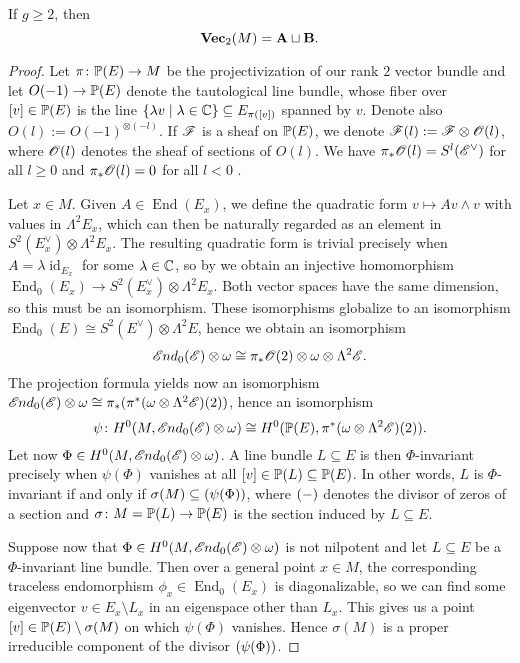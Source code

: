 \documentclass[A4paper, 12pt, british, reqno]{amsart}
\DeclareMathOperator{\End}{End}
\DeclareMathOperator{\id}{id}
\let\div\relax
\DeclareMathOperator{\div}{div}
\newcommand{\ot}{\otimes}
\newcommand{\dual}{^{\vee}}
\begin{document}
\begin{lm}\label{lm:twocases}
    If $g\geqslant 2$, then
    \[ \Vec_{2}(M)=\bfA\sqcup \bfB. \]
    \begin{proof}
	Let $\pi\colon \P(E)\to M$ be the projectivization of our rank $2$ vector bundle and let $O(-1)\to \P(E)$ denote the tautological line bundle, whose fiber over $[v]\in \P(E)$ is the line $\{\lambda v\mid \lambda\in \C\}\subseteq E_{\pi([v])}$ spanned by $v$.
	Denote also $O(l):=O(-1)^{\ot (-l)}$.
	If $\F$ is a sheaf on $\P(E)$, we denote $\F(l):=\F\ot \O(l)$, where $\O(l)$ denotes the sheaf of sections of $O(l)$.
	We have $\pi_{*}\O(l)=S^{l}(\E\dual)$ for all $l\geqslant 0$ and $\pi_{*}\O(l)=0$ for all $l<0$ \cite[Exercise III.8.4]{har77}.

	Let $x\in M$.
	Given $A\in \End(E_{x})$, we define the quadratic form $v\mapsto Av\wedge v$ with values in $\Lambda^{2}E_{x}$, which can then be naturally regarded as an element in $S^{2}(E_{x}\dual)\ot\Lambda^{2}E_{x}$.
	The resulting quadratic form is trivial precisely when $A=\lambda\id_{E_{x}}$ for some $\lambda\in \C$, so by  we obtain an injective homomorphism $\End_{0}(E_{x})\to S^{2}(E_{x}\dual)\ot \Lambda^{2}E_{x}$.
	Both vector spaces have the same dimension, so this must be an isomorphism.
	These isomorphisms globalize to an isomorphism $\End_{0}(E)\cong S^{2}(E\dual)\ot \Lambda^{2}E$, hence we obtain an isomorphism
	\[ \sEnd_{0}(\E)\ot \w\cong \pi_{*}\O(2)\ot \w \ot \Lambda^{2}\E. \]
	The projection formula yields now an isomorphism $\sEnd_{0}(\E)\ot \w\cong \pi_{*}(\pi^{*}(\w\ot \Lambda^{2}\E)(2))$, hence an isomorphism
	\[ \psi \colon H^{0}(M,\sEnd_{0}(\E)\ot \w)\cong H^{0}(\P(E),\pi^{*}(\w\ot \Lambda^{2}\E)(2)). \]
	Let now $\Phi\in H^{0}(M,\sEnd_{0}(\E)\ot \w)$.
	A line bundle $L\subseteq E$ is then $\Phi$-invariant precisely when $\psi(\Phi)$ vanishes at all $[v]\in \P(L)\subseteq \P(E)$.
	In other words, $L$ is $\Phi$-invariant if and only if $\sigma(M)\subseteq \div(\psi(\Phi))$, where $\div(-)$ denotes the divisor of zeros of a section and $\sigma\colon M=\P(L)\to \P(E)$ is the section induced by $L\subseteq E$.

	Suppose now that $\Phi\in H^{0}(M,\sEnd_{0}(\E)\ot \w)$ is not nilpotent and let $L\subseteq E$ be a $\Phi$-invariant line bundle.
	Then over a general point $x\in M$, the corresponding traceless endomorphism $\phi_{x}\in \End_{0}(E_{x})$ is diagonalizable, so we can find some eigenvector $v\in E_{x}\setminus L_{x}$ in an eigenspace other than $L_{x}$.
	This gives us a point $[v]\in \P(E)\setminus \sigma(M)$ on which $\psi(\Phi)$ vanishes.
	Hence $\sigma(M)$ is a proper irreducible component of the divisor $\div(\psi(\Phi))$.


\end{proof}
\end{lm}
\end{document}
